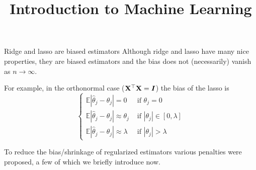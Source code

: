 \documentclass[11pt,compress,t,notes=noshow, xcolor=table]{beamer}
\title{Introduction to Machine Learning}
\begin{document}

\begin{vbframe}{Ridge and lasso are biased estimators} 
Although ridge and lasso have many nice properties, they are biased estimators and the bias does not (necessarily) vanish as $n \rightarrow \infty$.\\
\vspace{0.3cm}

For example, in the orthonormal case ($\mathbf{X}^{\top}\mathbf{X}=\bm{I}$) the bias of the lasso is
$$
\begin{cases}\mathbb{E}\left|\widehat{\theta}_j-\theta_j\right|=0 & \text { if } \theta_j=0 \\ \mathbb{E}\left|\widehat{\theta}_j-\theta_j\right| \approx \theta_j & \text { if }\left|\theta_j\right| \in[0, \lambda] \\ \mathbb{E}\left|\widehat{\theta}_j-\theta_j\right| \approx \lambda & \text { if }\left|\theta_j\right|>\lambda\end{cases}
$$
\vspace{0.3cm}

\vspace{0.2cm}
To reduce the bias/shrinkage of regularized estimators various penalties were proposed, a few of which we briefly introduce now.

\end{vbframe}
\end{document}
